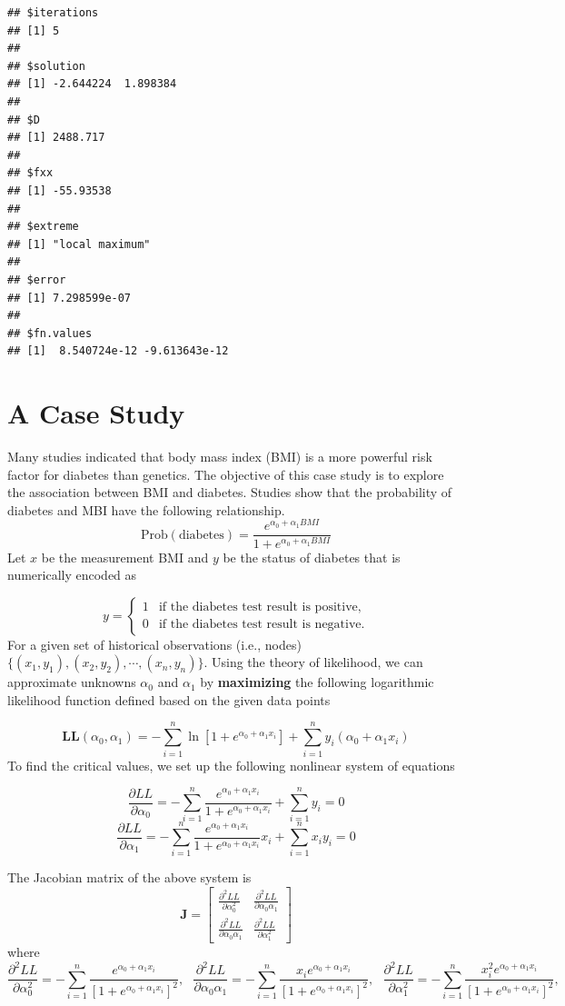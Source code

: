 \documentclass[
]{book}
\begin{document}
\begin{verbatim}
## $iterations
## [1] 5
## 
## $solution
## [1] -2.644224  1.898384
## 
## $D
## [1] 2488.717
## 
## $fxx
## [1] -55.93538
## 
## $extreme
## [1] "local maximum"
## 
## $error
## [1] 7.298599e-07
## 
## $fn.values
## [1]  8.540724e-12 -9.613643e-12
\end{verbatim}

\hfill\break

\hypertarget{a-case-study}{%
\section{A Case Study}\label{a-case-study}}

Many studies indicated that body mass index (BMI) is a more powerful risk factor for diabetes than genetics. The objective of this case study is to explore the association between BMI and diabetes. Studies show that the probability of diabetes and MBI have the following relationship.
\[
\text{Prob}(\text{diabetes}) = \frac{e^{\alpha_0 + \alpha_1 BMI}}{1 + e^{\alpha_0 + \alpha_1 BMI}}
\]
Let \(x\) be the measurement BMI and \(y\) be the status of diabetes that is numerically encoded as

\[
y = \left\{
\begin{array}{ll}
 1 & \text{if the diabetes test result is positive},\\
 0 & \text{if the diabetes test result is negative}.
\end{array}
\right.
\]
For a given set of historical observations (i.e., nodes) \(\{(x_1,y_1), (x_2, y_2), \cdots, (x_n, y_n)\}\). Using the theory of likelihood, we can approximate unknowns \(\alpha_0\) and \(\alpha_1\) by \textbf{maximizing} the following logarithmic likelihood function defined based on the given data points

\[
\mathbf{LL}(\alpha_0, \alpha_1) = -\sum_{i=1}^n\ln[1+e^{\alpha_0 + \alpha_1 x_i}]+ \sum_{i=1}^ny_i(\alpha_0 + \alpha_1 x_i)
\]
To find the critical values, we set up the following nonlinear system of equations

\[
\frac{\partial LL}{\partial \alpha_0} = -\sum_{i=1}^n \frac{e^{\alpha_0+\alpha_1x_i}}{1+e^{\alpha_0+\alpha_1x_i}}+\sum_{i=1}^ny_i = 0
\]
\[
\frac{\partial LL}{\partial \alpha_1} = -\sum_{i=1}^n \frac{e^{\alpha_0+\alpha_1x_i}}{1+e^{\alpha_0+\alpha_1x_i}}x_i+\sum_{i=1}^nx_iy_i = 0
\]

The Jacobian matrix of the above system is
\[
\mathbf{J} = \left[ 
\begin{array}{cc}
\frac{\partial^2 LL}{\partial \alpha_0^2} & \frac{\partial^2 LL}{\partial \alpha_0\alpha_1} \\
\frac{\partial^2 LL}{\partial \alpha_0\alpha_1} & \frac{\partial^2 LL}{\partial \alpha_1^2}
\end{array}
\right]
\]
where
\[
\frac{\partial^2 LL}{\partial \alpha_0^2} = -\sum_{i=1}^n \frac{e^{\alpha_0+\alpha_1x_i}}{[1+e^{\alpha_0+\alpha_1x_i}]^2},
~~~
\frac{\partial^2 LL}{\partial \alpha_0\alpha_1} = -\sum_{i=1}^n \frac{x_ie^{\alpha_0+\alpha_1x_i}}{[1+e^{\alpha_0+\alpha_1x_i}]^2},
~~~
\frac{\partial^2 LL}{\partial \alpha_1^2} = -\sum_{i=1}^n \frac{x_i^2e^{\alpha_0+\alpha_1x_i}}{[1+e^{\alpha_0+\alpha_1x_i}]^2},
\]
\end{document}
